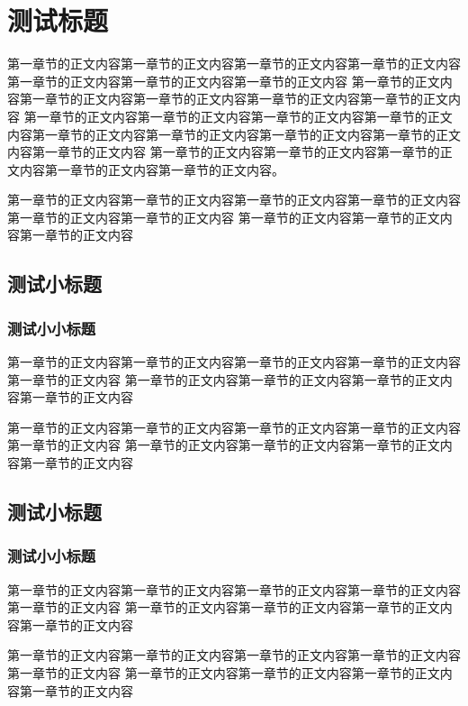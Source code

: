 \documentclass{yacauthesisug}
\begin{document}
\section{测试标题}

第一章节的正文内容第一章节的正文内容第一章节的正文内容第一章节的正文内容第一章节的正文内容第一章节的正文内容第一章节的正文内容
第一章节的正文内容第一章节的正文内容第一章节的正文内容第一章节的正文内容第一章节的正文内容
第一章节的正文内容第一章节的正文内容第一章节的正文内容第一章节的正文内容第一章节的正文内容第一章节的正文内容第一章节的正文内容第一章节的正文内容第一章节的正文内容
第一章节的正文内容第一章节的正文内容第一章节的正文内容第一章节的正文内容第一章节的正文内容。

第一章节的正文内容第一章节的正文内容第一章节的正文内容第一章节的正文内容第一章节的正文内容第一章节的正文内容
第一章节的正文内容第一章节的正文内容第一章节的正文内容

\subsection{测试小标题}
\subsubsection{测试小小标题}

第一章节的正文内容第一章节的正文内容第一章节的正文内容第一章节的正文内容第一章节的正文内容
第一章节的正文内容第一章节的正文内容第一章节的正文内容第一章节的正文内容

第一章节的正文内容第一章节的正文内容第一章节的正文内容第一章节的正文内容第一章节的正文内容
第一章节的正文内容第一章节的正文内容第一章节的正文内容第一章节的正文内容

\subsection{测试小标题}
\subsubsection{测试小小标题}

第一章节的正文内容第一章节的正文内容第一章节的正文内容第一章节的正文内容第一章节的正文内容
第一章节的正文内容第一章节的正文内容第一章节的正文内容第一章节的正文内容

第一章节的正文内容第一章节的正文内容\cite{Huzhenzhen2018}第一章节的正文内容第一章节的正文内容第一章节的正文内容
第一章节的正文内容第一章节的正文内容第一章节的正文内容第一章节的正文内容
\end{document}
